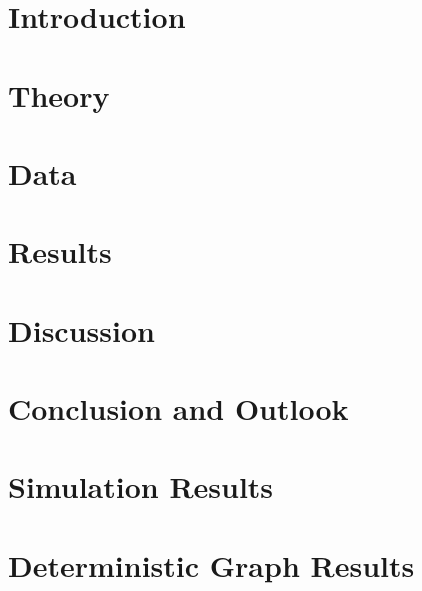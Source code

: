\documentclass[12pt]{report}
\begin{document}
  \printacronyms[include=abbrev,name=List of Abbreviations]

  \onehalfspacing
  \chapter{Introduction}
  


  \chapter{Theory}
  \label{section:theory}
  
 

  \chapter{Data}
  \label{section:data}
  
  
  \chapter{Results}
  \label{section:results}
  
  
  \chapter{Discussion}
  \label{section:discussion}
  

  \chapter{Conclusion and Outlook}
  \label{section:conclusion_outlook}
  

  \newpage
  \renewcommand\bibname{References}
  

  \appendix
  \chapter{Simulation Results}
  

  \chapter{Deterministic Graph Results}
  \label{app:det_graphs}
  
\end{document}
